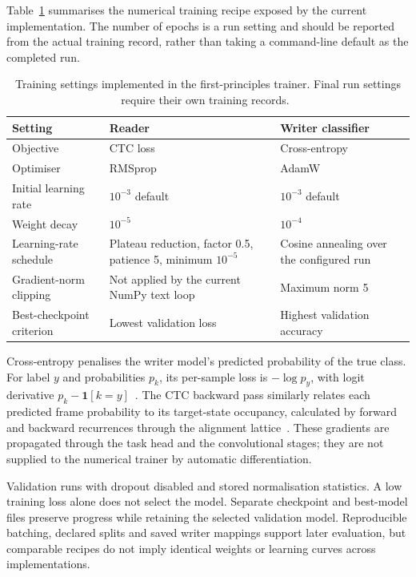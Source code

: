 Table~\ref{tab:des-training} summarises the numerical training recipe exposed by the current implementation. The number of epochs is a run setting and should be reported from the actual training record, rather than taking a command-line default as the completed run.~\cite[recognise.py; train.py]{braunepipeline2026}


\begin{table}[!htbp]\centering\small
\begin{tabularx}{\linewidth}{|l|X|X|}
\hline\textbf{Setting}&\textbf{Reader}&\textbf{Writer classifier}\\\hline
Objective&CTC loss&Cross-entropy\\\hline
Optimiser&RMSprop&AdamW\\\hline
Initial learning rate&$10^{-3}$ default&$10^{-3}$ default\\\hline
Weight decay&$10^{-5}$&$10^{-4}$\\\hline
Learning-rate schedule&Plateau reduction, factor 0.5, patience 5, minimum $10^{-5}$&Cosine annealing over the configured run\\\hline
Gradient-norm clipping&Not applied by the current NumPy text loop&Maximum norm 5\\\hline
Best-checkpoint criterion&Lowest validation loss&Highest validation accuracy\\\hline
\end{tabularx}
\caption{Training settings implemented in the first-principles trainer. Final run settings require their own training records.~\cite{brauneevidence2026,braunepipeline2026}}
\label{tab:des-training}
\end{table}

Cross-entropy penalises the writer model's predicted probability of the true class. For label $y$ and probabilities $p_k$, its per-sample loss is $-\log p_y$, with logit derivative $p_k-\mathbf{1}[k=y]$~\cite[p.~6, Eqs.~(13)--(14)]{graves2013}. The CTC backward pass similarly relates each predicted frame probability to its target-state occupancy, calculated by forward and backward recurrences through the alignment lattice~\cite[PDF pp.~4--6]{graves2006}. These gradients are propagated through the task head and the convolutional stages; they are not supplied to the numerical trainer by automatic differentiation.~\cite[recognise.py; train.py; trainlibrary.py]{braunepipeline2026}

Validation runs with dropout disabled and stored normalisation statistics. A low training loss alone does not select the model. Separate checkpoint and best-model files preserve progress while retaining the selected validation model. Reproducible batching, declared splits and saved writer mappings support later evaluation, but comparable recipes do not imply identical weights or learning curves across implementations.~\cite[recognise.py; train.py; trainlibrary.py]{braunepipeline2026}

